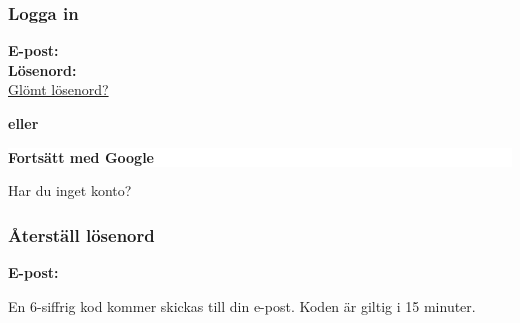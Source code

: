 \documentclass[10pt]{beamer}
\begin{document}
\begin{frame}[label=login]
  \frametitle{Logga in}

  \vspace{0.5cm}
  \begin{minipage}{0.9\textwidth}
    \small
    \textbf{E-post:} \underline{\hspace{6.5cm}} \\
    \textbf{Lösenord:} \underline{\hspace{6.5cm}} \\
    
    \vspace{0.3cm}
    \footnotesize
    \hyperlink{forgotpassword}{\textcolor{terracotta}{Glömt lösenord?}}

    \vspace{0.6cm}
    \footnotesize

    \vspace{0.8cm}
    \centering

    \vspace{1.2cm}
    \textcolor{warmbrown}{\textbf{eller}}

    \vspace{0.6cm}
    \colorbox{white}{%
      \parbox{5cm}{\centering\footnotesize\textbf{Fortsätt med Google}}%
    }
  \end{minipage}

  \vspace{0.8cm}
  \begin{center}
    \footnotesize
    Har du inget konto? \hyperlink{register}{}
  \end{center}
\end{frame}

\begin{frame}[label=forgotpassword]
  \frametitle{Återställ lösenord}

  \vspace{0.5cm}
  \begin{minipage}{0.9\textwidth}
    \small
    \textbf{E-post:} \underline{\hspace{6.5cm}} \\

    \vspace{1cm}
    \centering

    \vspace{1cm}
    \footnotesize
    En 6-siffrig kod kommer skickas till din e-post. Koden är giltig i 15 minuter.
  \end{minipage}

  \vspace{0.8cm}
  \begin{center}
    \footnotesize
    \hyperlink{login}{}
  \end{center}
\end{frame}
\end{document}
